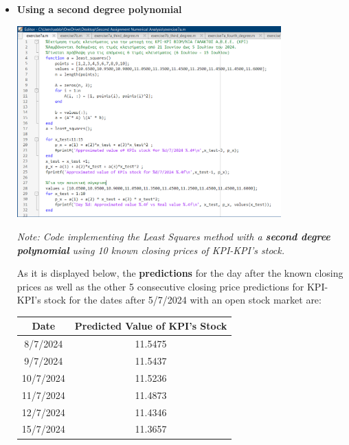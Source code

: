 \documentclass{article}
\begin{document}
\begin{itemize}
    \item \textbf{Using a second degree polynomial }
\begin{tcolorbox}[colback=red!10, colframe=gray!80, width=\textwidth, sharp corners]
    \centering 
    \includegraphics[width=0.8\textwidth,height=0.38\textheight]{Exercise7aSecond.png} 

    \vspace{0.1cm}
    \small\textit{Note: Code implementing the Least Squares method with a \textbf{second degree polynomial} using 10 known closing prices of KPI-KPI's stock. }
\end{tcolorbox}


As it is displayed below, the \textbf{predictions} for the day after the known closing prices as well as the other 5 consecutive closing price predictions for KPI-KPI's stock for the dates after 5/7/2024 with an open stock market are:
\begin{center}
    \begin{tabular}{|c|c|}
        \hline
        \textbf{Date} & \textbf{Predicted Value of KPI's Stock} \\
        \hline
        8/7/2024 & 11.5475 \\
        9/7/2024 & 11.5437 \\
        10/7/2024 & 11.5236 \\
        11/7/2024 & 11.4873 \\
        12/7/2024 & 11.4346 \\
        15/7/2024 & 11.3657 \\
        \hline
    \end{tabular}
\end{center}


\end{itemize}
\end{document}
